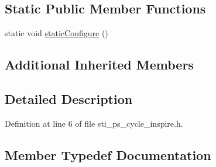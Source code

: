 \subsection*{Static Public Member Functions}
\begin{DoxyCompactItemize}
\item 
static void \hyperlink{structsm__respira__1_1_1ps__cycle__inner__states_1_1StiPSCycleInspire_ae25c1dc3d7e5e77c1fac2a79244006bd}{static\+Configure} ()
\end{DoxyCompactItemize}
\subsection*{Additional Inherited Members}


\subsection{Detailed Description}


Definition at line 6 of file sti\+\_\+ps\+\_\+cycle\+\_\+inspire.\+h.



\subsection{Member Typedef Documentation}
\mbox{\label{structsm__respira__1_1_1ps__cycle__inner__states_1_1StiPSCycleInspire_af0b2d05939d43e27ee47eadfc5327e93}} 
